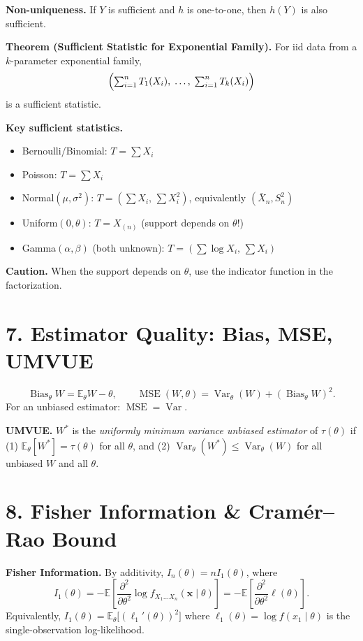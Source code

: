 \documentclass[11pt]{article}
\newcommand{\bbE}{\mathbb{E}}
\newcommand{\Var}{\operatorname{Var}}
\newcommand{\Bias}{\operatorname{Bias}}
\newcommand{\MSE}{\operatorname{MSE}}
\begin{document}
\textbf{Non-uniqueness.} If $Y$ is sufficient and $h$ is one-to-one,
then $h(Y)$ is also sufficient.

\medskip
\textbf{Theorem (Sufficient Statistic for Exponential Family).}
For iid data from a $k$-parameter exponential family,
\[
  \Bigl(\textstyle\sum_{i=1}^n T_1(X_i),\;\ldots,\;\sum_{i=1}^n T_k(X_i)\Bigr)
\]
is a sufficient statistic.

\medskip
\noindent\textbf{Key sufficient statistics.}
\begin{itemize}
  \item Bernoulli/Binomial: $T=\sum X_i$
  \item Poisson: $T=\sum X_i$
  \item Normal$(\mu,\sigma^2)$: $T=(\sum X_i,\,\sum X_i^2)$,
    equivalently $(\bar X_n, S_n^2)$
  \item Uniform$(0,\theta)$: $T=X_{(n)}$ (support depends on $\theta$!)
  \item Gamma$(\alpha,\beta)$ (both unknown): $T=(\sum\log X_i,\,\sum X_i)$
\end{itemize}

\textbf{Caution.} When the support depends on $\theta$, use the
indicator function in the factorization.

\section*{7.\; Estimator Quality: Bias, MSE, UMVUE}

\[
  \Bias_\theta W = \bbE_\theta W - \theta, \qquad
  \MSE(W,\theta) = \Var_\theta(W) + (\Bias_\theta W)^2.
\]
For an unbiased estimator: $\MSE = \Var$.

\medskip
\textbf{UMVUE.} $W^*$ is the \emph{uniformly minimum variance
unbiased estimator} of $\tau(\theta)$ if
(1) $\bbE_\theta[W^*]=\tau(\theta)$ for all $\theta$, and (2)
$\Var_\theta(W^*)\leq\Var_\theta(W)$ for all unbiased $W$ and all $\theta$.

\section*{8.\; Fisher Information \& Cramér--Rao Bound}

\textbf{Fisher Information.}
By additivity, $I_n(\theta)=nI_1(\theta)$, where
\[
  I_1(\theta)
  = -\bbE\!\left[\frac{\partial^2}{\partial\theta^2}\log
  f_{X_1\hdots X_n}(\mathbf{x}\mid\theta)\right]
  = -\bbE\!\left[\frac{\partial^2}{\partial\theta^2}\ell(\theta)\right].
\]
Equivalently, $I_1(\theta)=\bbE_\theta\!\bigl[(\ell_1'(\theta))^2\bigr]$
where $\ell_1(\theta)=\log f(x_1\mid\theta)$ is the
single-observation log-likelihood.
\end{document}

